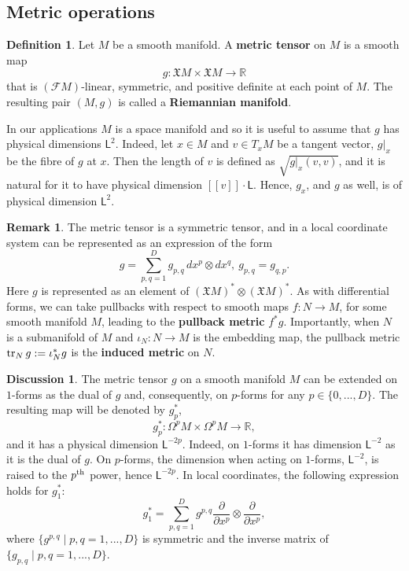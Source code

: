 \documentclass{elsarticle}
\theoremstyle{definition}
\newtheorem{definition}[theorem]{Definition}
\newtheorem{discussion}[theorem]{Discussion}
\newtheorem{remark}[theorem]{Remark}
\newcommand{\tr}{\mathop{\rm tr}\nolimits}
\newcommand{\R}{\mathbb{R}}
\newcommand{\set}[2]{\{#1 \mid #2\}}
\newcommand{\restrict}[2]{\left.#1\right|_{#2}}
\newcommand{\newterm}[1]{\textbf{#1}}
\newcommand{\length}{\mathsf{L}}
\begin{document}
\subsection{Metric operations}
\phantom{T}
\label{sec:exterior_calculus/metric}
\begin{definition}
  Let $M$ be a smooth manifold.
  A \newterm{metric tensor} on $M$ is a smooth map
  \begin{equation}
    g \colon \mathfrak{X} M \times \mathfrak{X} M \to \R
  \end{equation}
  that is $(\mathcal{F} M)$-linear, symmetric, and positive definite at each point of $M$.
  The resulting pair $(M, g)$ is called a \newterm{Riemannian manifold}.

  In our applications $M$ is a space manifold and so it is useful to assume that $g$ has physical dimensions $\length^2$.
  Indeed, let $x \in M$ and $v \in T_x M$ be a tangent vector, $\restrict{g}{x}$ be the fibre of $g$ at $x$.
  Then the length of $v$ is defined as $\sqrt{\restrict{g}{x}(v, v)}$, and it is natural for it to have physical dimension $[[v]] \cdot \length$.
  Hence, $g_x$, and $g$ as well, is of physical dimension $\length^2$.
\end{definition}
\begin{remark}
  The metric tensor is a symmetric tensor, and in a local coordinate system can be represented as an expression of the form
  \begin{equation}
    g = \sum_{p, q = 1}^D g_{p, q}\, d x^p \otimes d x^q,\ g_{p, q} = g_{q, p}.
  \end{equation}
  Here $g$ is represented as an element of $(\mathfrak{X} M)^* \otimes (\mathfrak{X} M)^*$.
  As with differential forms, we can take pullbacks with respect to smooth maps $f \colon N \to M$, for some smooth manifold $M$, leading to the \newterm{pullback metric} $f^* g$.
  Importantly, when $N$ is a submanifold of $M$ and $\iota_N \colon N \to M$ is the embedding map, the pullback metric $\tr_N g := \iota_N^* g$ is the \newterm{induced metric} on $N$.
\end{remark}
\begin{discussion}
  The metric tensor $g$ on a smooth manifold $M$ can be extended on $1$-forms as the dual of $g$ and, consequently, on $p$-forms for any $p \in \{0, ..., D\}$.
  The resulting map will be denoted by $g^*_p$,
  \begin{equation}
    g^*_p \colon \Omega^p M \times \Omega^p M \to \R,
  \end{equation}
  and it has a physical dimension $\length^{-2 p}$.
  Indeed, on $1$-forms it has dimension $\length^{-2}$ as it is the dual of $g$.
  On $p$-forms, the dimension when acting on $1$-forms, $\length^{-2}$, is raised to the $p^{\rm th}$ power, hence $\length^{-2 p}$.
  In local coordinates, the following expression holds for $g^*_1$:
  \begin{equation}
    g^*_1 = \sum_{p, q = 1}^D g^{p, q} \frac{\partial}{\partial x^p} \otimes \frac{\partial}{\partial x^p},
  \end{equation}
  where $\set{g^{p, q}}{p, q = 1, ..., D}$ is symmetric and the inverse matrix of $\set{g_{p, q}}{p, q = 1, ..., D}$.
\end{discussion}
\end{document}
